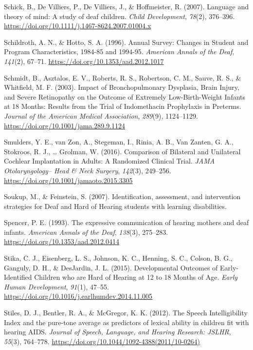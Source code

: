 \documentclass[english,man,floatsintext]{apa6}
\begin{document}
\leavevmode\hypertarget{ref-schick2007}{}%
Schick, B., De Villiers, P., De Villiers, J., \& Hoffmeister, R. (2007). Language and theory of mind: A study of deaf children. \emph{Child Development}, \emph{78}(2), 376--396. \url{https://doi.org/10.1111/j.1467-8624.2007.01004.x}

\leavevmode\hypertarget{ref-schildroth1996}{}%
Schildroth, A. N., \& Hotto, S. A. (1996). Annual Survey: Changes in Student and Program Characteristics, 1984-85 and 1994-95. \emph{American Annals of the Deaf}, \emph{141}(2), 67--71. \url{https://doi.org/10.1353/aad.2012.1017}

\leavevmode\hypertarget{ref-schmidt2003}{}%
Schmidt, B., Asztalos, E. V., Roberts, R. S., Robertson, C. M., Sauve, R. S., \& Whitfield, M. F. (2003). Impact of Bronchopulmonary Dysplasia, Brain Injury, and Severe Retinopathy on the Outcome of Extremely Low-Birth-Weight Infants at 18 Months: Results from the Trial of Indomethacin Prophylaxis in Preterms. \emph{Journal of the American Medical Association}, \emph{289}(9), 1124--1129. \url{https://doi.org/10.1001/jama.289.9.1124}

\leavevmode\hypertarget{ref-smulders2016}{}%
Smulders, Y. E., van Zon, A., Stegeman, I., Rinia, A. B., Van Zanten, G. A., Stokroos, R. J., \ldots{} Grolman, W. (2016). Comparison of Bilateral and Unilateral Cochlear Implantation in Adults: A Randomized Clinical Trial. \emph{JAMA Otolaryngology-- Head \& Neck Surgery}, \emph{142}(3), 249--256. \url{https://doi.org/10.1001/jamaoto.2015.3305}

\leavevmode\hypertarget{ref-soukup2007}{}%
Soukup, M., \& Feinstein, S. (2007). Identification, assessment, and intervention strategies for Deaf and Hard of Hearing students with learning disabilities.

\leavevmode\hypertarget{ref-spencer1993}{}%
Spencer, P. E. (1993). The expressive communication of hearing mothers and deaf infants. \emph{American Annals of the Deaf}, \emph{138}(3), 275--283. \url{https://doi.org/10.1353/aad.2012.0414}

\leavevmode\hypertarget{ref-stika2015}{}%
Stika, C. J., Eisenberg, L. S., Johnson, K. C., Henning, S. C., Colson, B. G., Ganguly, D. H., \& DesJardin, J. L. (2015). Developmental Outcomes of Early-Identified Children who are Hard of Hearing at 12 to 18 Months of Age. \emph{Early Human Development}, \emph{91}(1), 47--55. \url{https://doi.org/10.1016/j.earlhumdev.2014.11.005}

\leavevmode\hypertarget{ref-stiles2012}{}%
Stiles, D. J., Bentler, R. A., \& McGregor, K. K. (2012). The Speech Intelligibility Index and the pure-tone average as predictors of lexical ability in children fit with hearing AIDS. \emph{Journal of Speech, Language, and Hearing Research: JSLHR}, \emph{55}(3), 764--778. \url{https://doi.org/10.1044/1092-4388(2011/10-0264)}
\end{document}
